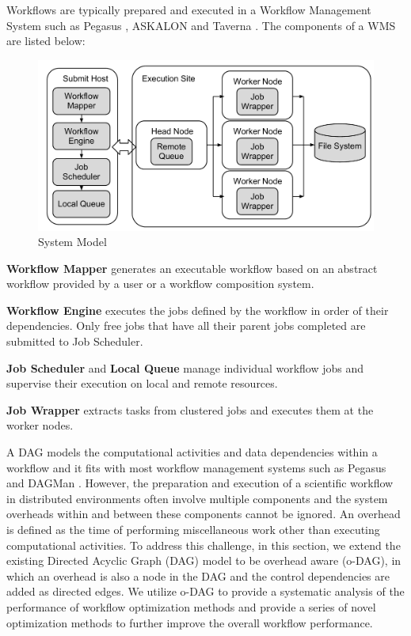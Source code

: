 Workflows are typically prepared and executed in a Workflow Management System such as Pegasus \cite{Deelman2004}, ASKALON \cite{Ostermann2009b} and Taverna \cite{Calasanz2008}. The components of a WMS are listed below: 

\begin{figure}[h!]
\centering
  \includegraphics[width=0.7\linewidth]{figures/model/model.pdf}

  \caption{System Model}
  \label{fig:model_system}
\end{figure}


\textbf{Workflow Mapper} generates an executable workflow based on an abstract workflow provided by a user or a workflow composition system. 

\textbf{Workflow Engine} executes the jobs defined by the workflow in order of their dependencies. Only free jobs that have all their parent jobs completed are submitted to  Job Scheduler. 

\textbf{Job Scheduler} and \textbf{Local Queue} manage individual workflow jobs and supervise their execution on local and remote resources.

\textbf{Job Wrapper} extracts tasks from clustered jobs and executes them at the worker nodes. 

A DAG models the computational activities and data dependencies within a workflow and it fits with most workflow management systems such as Pegasus \cite{Deelman2004} and DAGMan \cite{Kalayci2010}. However, the preparation and execution of a scientific workflow in distributed environments often involve multiple components and the system overheads within and between these components cannot be ignored. 
An overhead is defined as the time of performing miscellaneous work other than executing computational activities. 
To address this challenge, in this section, we extend the existing Directed Acyclic Graph (DAG) model to be overhead aware (o-DAG), in which an overhead is also a node in the DAG and the control dependencies are added as directed edges. We utilize o-DAG to provide a systematic analysis of the performance of workflow optimization methods and provide a series of novel optimization methods to further improve the overall workflow performance. 


